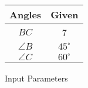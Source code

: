 \begin{tabular}[12pt]{ |c| c|}
    \hline
    \textbf{Angles} & \textbf{Given}\\ 
    \hline
     $BC$ & 7 \\
    \hline 
     $\angle{B}$ & $45^\circ$\\
    \hline
     $\angle{C}$& $60^\circ$\\
    \hline
    \end{tabular}
    \caption{Input Parameters}
